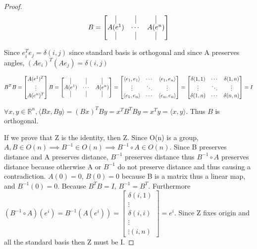 \documentclass{article}
\newcommand{\R}{\mathbb{R}}
\newcommand{\angles}[1]{\langle #1 \rangle}
\begin{document}
\begin{proof}
    \[
        B = \begin{bmatrix}{}
            \vline & \vline & \vline \\
            A(e^1) & \cdots & A(e^n) \\
            \vline & \vline & \vline \\
        \end{bmatrix}
    \]

    Since $e_i^Te_j = \delta(i, j)$ since standard basis is orthogonal and since A preserves angles, $(Ae_i)^T(Ae_j) = \delta(i, j)$

    \[
        B^T B = \begin{bmatrix}{}
            A(e^1)^T \\
            \vdots \\
            A(e^n)^T
        \end{bmatrix} B = \begin{bmatrix}{}
            \vline & \vline & \vline \\
            A(e^1) & \cdots & A(e^n) \\
            \vline & \vline & \vline \\
        \end{bmatrix} = \begin{bmatrix}
            \angles{e_1, e_1} & \cdots & \angles{e_1, e_n} \\
            \vdots & \ddots & \vdots \\
            \angles{e_1, e_n} & \cdots & \angles{e_n, e_n}
        \end{bmatrix} = \begin{bmatrix}
            \delta(1, 1) & \cdots & \delta(1, n) \\
            \vdots & \ddots & \vdots \\
            \delta(1, n) & \cdots &  \delta(n, n)
        \end{bmatrix} = I
    \]

    $\forall x,y \in \R^n, \angles{Bx, By} = (Bx)^TBy= x^TB^TBy = x^Ty = \angles{x, y}$. Thus $B$ is orthogonal.

    If we prove that Z is the identity, then Z. Since O(n) is a group, $A, B \in O(n) \implies B^{-1} \in O(n) \implies B^{-1} \circ A \in O(n)$. Since B preserves distance and A preserves distance, $B^{-1}$ preserves distance thus $B^{-1} \circ A$ preserves distance because otherwise A or $B^{-1}$ do not preserve distance and thus causing a contradiction. $A(0) = 0$, $B(0) = 0$ because B is a matrix thus a linear map, and $B^{-1}(0) = 0$. Because $B^TB = I$, $B^{-1} = B^T$. Furthermore $(B^{-1} \circ A)(e^i) = B^{-1}(A(e^{i})) = \begin{bmatrix}
        \delta(i, 1) \\
        \vdots \\
        \delta(i , i) \\
        \vdots \\ 
        \vdots(i, n)
    \end{bmatrix} = e^i$. Since Z fixes origin and all the standard basis then Z must be I.
\end{proof}
\end{document}

